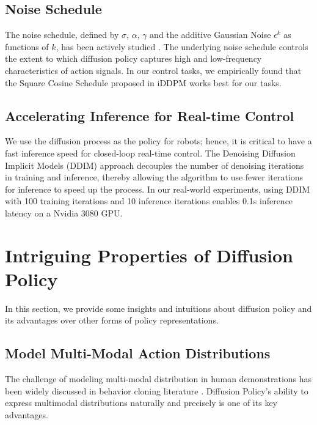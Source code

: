 \documentclass[Afour,sageh,times]{sagej}
\begin{document}
\subsection{Noise Schedule}
\label{sec:method-noise-schedule}
The noise schedule, defined by $\sigma$, $\alpha$, $\gamma$ and the additive Gaussian Noise $\epsilon^k$ as functions of $k$, has been actively studied \cite{ho2020denoising, nichol2021improved}.  The underlying noise schedule controls the extent to which diffusion policy captures high and low-frequency characteristics of action signals. In our control tasks, we empirically found that the Square Cosine Schedule proposed in iDDPM \cite{nichol2021improved} works best for our tasks. 

\subsection{Accelerating Inference for Real-time Control}
We use the diffusion process as the policy for robots; hence, it is critical to have a fast inference speed for closed-loop real-time control. The Denoising Diffusion Implicit Models (DDIM) approach \cite{song2021ddim}  decouples the number of denoising iterations in training and inference, thereby allowing the algorithm to use fewer iterations for inference to speed up the process. In our real-world experiments, using DDIM with 100 training iterations and 10 inference iterations enables 0.1s inference latency on a Nvidia 3080 GPU.

\section{Intriguing Properties of Diffusion Policy}
In this section, we provide some insights and intuitions about diffusion policy and its advantages over other forms of policy representations. 



\subsection{Model Multi-Modal Action Distributions}
\label{sec:multimodal}
The challenge of modeling multi-modal distribution in human demonstrations has been widely discussed in behavior cloning literature \cite{ibc,bet,robomimic}. Diffusion Policy's ability to express multimodal distributions naturally and precisely is one of its key advantages. 

\end{document}
